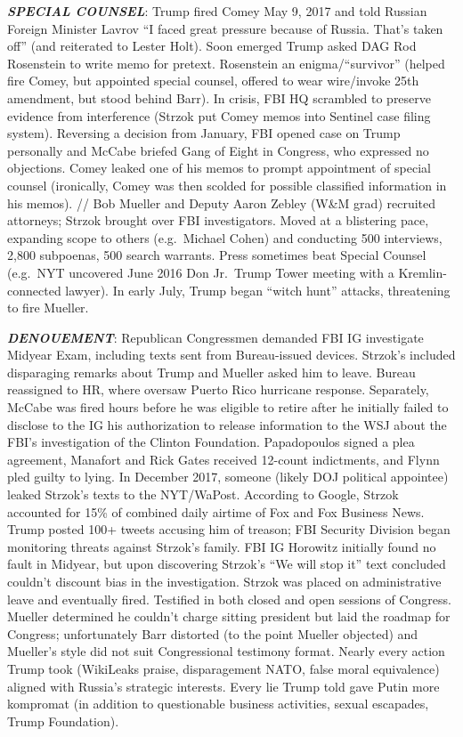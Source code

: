 \documentclass[
]{article}
\begin{document}
\textbf{\emph{SPECIAL COUNSEL}}: Trump fired Comey May 9, 2017 and told
Russian Foreign Minister Lavrov ``I faced great pressure because of
Russia. That's taken off'' (and reiterated to Lester Holt). Soon emerged
Trump asked DAG Rod Rosenstein to write memo for pretext. Rosenstein an
enigma/``survivor'' (helped fire Comey, but appointed special counsel,
offered to wear wire/invoke 25th amendment, but stood behind Barr). In
crisis, FBI HQ scrambled to preserve evidence from interference (Strzok
put Comey memos into Sentinel case filing system). Reversing a decision
from January, FBI opened case on Trump personally and McCabe briefed
Gang of Eight in Congress, who expressed no objections. Comey leaked one
of his memos to prompt appointment of special counsel (ironically, Comey
was then scolded for possible classified information in his memos). //
Bob Mueller and Deputy Aaron Zebley (W\&M grad) recruited attorneys;
Strzok brought over FBI investigators. Moved at a blistering pace,
expanding scope to others (e.g.~Michael Cohen) and conducting 500
interviews, 2,800 subpoenas, 500 search warrants. Press sometimes beat
Special Counsel (e.g.~NYT uncovered June 2016 Don Jr.~Trump Tower
meeting with a Kremlin-connected lawyer). In early July, Trump began
``witch hunt'' attacks, threatening to fire Mueller.

\textbf{\emph{DENOUEMENT}}: Republican Congressmen demanded FBI IG
investigate Midyear Exam, including texts sent from Bureau-issued
devices. Strzok's included disparaging remarks about Trump and Mueller
asked him to leave. Bureau reassigned to HR, where oversaw Puerto Rico
hurricane response. Separately, McCabe was fired hours before he was
eligible to retire after he initially failed to disclose to the IG his
authorization to release information to the WSJ about the FBI's
investigation of the Clinton Foundation. Papadopoulos signed a plea
agreement, Manafort and Rick Gates received 12-count indictments, and
Flynn pled guilty to lying. In December 2017, someone (likely DOJ
political appointee) leaked Strzok's texts to the NYT/WaPost. According
to Google, Strzok accounted for 15\% of combined daily airtime of Fox
and Fox Business News. Trump posted 100+ tweets accusing him of treason;
FBI Security Division began monitoring threats against Strzok's family.
FBI IG Horowitz initially found no fault in Midyear, but upon
discovering Strzok's ``We will stop it'' text concluded couldn't
discount bias in the investigation. Strzok was placed on administrative
leave and eventually fired. Testified in both closed and open sessions
of Congress. Mueller determined he couldn't charge sitting president but
laid the roadmap for Congress; unfortunately Barr distorted (to the
point Mueller objected) and Mueller's style did not suit Congressional
testimony format. Nearly every action Trump took (WikiLeaks praise,
disparagement NATO, false moral equivalence) aligned with Russia's
strategic interests. Every lie Trump told gave Putin more kompromat (in
addition to questionable business activities, sexual escapades, Trump
Foundation).
\end{document}
